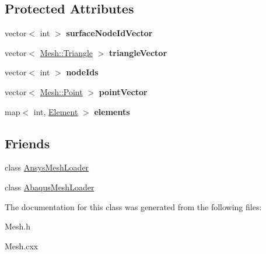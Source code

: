 \subsection*{Protected Attributes}
\begin{DoxyCompactItemize}
\item 
\hypertarget{class_mesh_ab67fcb16adc8286624cf43978174a8c1}{
vector$<$ int $>$ {\bfseries surfaceNodeIdVector}}
\label{class_mesh_ab67fcb16adc8286624cf43978174a8c1}

\item 
\hypertarget{class_mesh_a2030d33cdb85ff0e636fc6a157ad8f3b}{
vector$<$ \hyperlink{struct_mesh_1_1_triangle}{Mesh::Triangle} $>$ {\bfseries triangleVector}}
\label{class_mesh_a2030d33cdb85ff0e636fc6a157ad8f3b}

\item 
\hypertarget{class_mesh_a9383dbfed66e212f6c27d202cdcd6e78}{
vector$<$ int $>$ {\bfseries nodeIds}}
\label{class_mesh_a9383dbfed66e212f6c27d202cdcd6e78}

\item 
\hypertarget{class_mesh_a1c920f26e6f3805039d2ad44f6cd723b}{
vector$<$ \hyperlink{struct_mesh_1_1_point}{Mesh::Point} $>$ {\bfseries pointVector}}
\label{class_mesh_a1c920f26e6f3805039d2ad44f6cd723b}

\item 
\hypertarget{class_mesh_ab4feeecebeaccd16cd0d655866e0bcce}{
map$<$ int, \hyperlink{struct_mesh_1_1_element}{Element} $>$ {\bfseries elements}}
\label{class_mesh_ab4feeecebeaccd16cd0d655866e0bcce}

\end{DoxyCompactItemize}
\subsection*{Friends}
\begin{DoxyCompactItemize}
\item 
\hypertarget{class_mesh_a5da36615b6c00ca1941e7504222978be}{
class \hyperlink{class_mesh_a5da36615b6c00ca1941e7504222978be}{AnsysMeshLoader}}
\label{class_mesh_a5da36615b6c00ca1941e7504222978be}

\item 
\hypertarget{class_mesh_a7b065f6fb884c97bbb9100e204979c70}{
class \hyperlink{class_mesh_a7b065f6fb884c97bbb9100e204979c70}{AbaqusMeshLoader}}
\label{class_mesh_a7b065f6fb884c97bbb9100e204979c70}

\end{DoxyCompactItemize}


The documentation for this class was generated from the following files:\begin{DoxyCompactItemize}
\item 
Mesh.h\item 
Mesh.cxx\end{DoxyCompactItemize}

